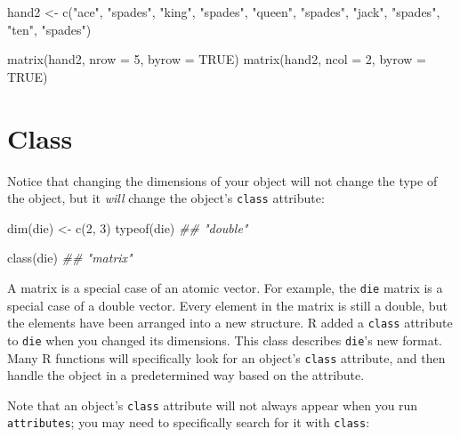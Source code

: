 \documentclass[
  letterpaper,
  DIV=11,
  numbers=noendperiod]{scrbook}
\newenvironment{Shaded}{\begin{snugshade}}{\end{snugshade}}
\newcommand{\AttributeTok}[1]{\textcolor[rgb]{0.40,0.45,0.13}{#1}}
\newcommand{\ConstantTok}[1]{\textcolor[rgb]{0.56,0.35,0.01}{#1}}
\newcommand{\DecValTok}[1]{\textcolor[rgb]{0.68,0.00,0.00}{#1}}
\newcommand{\DocumentationTok}[1]{\textcolor[rgb]{0.37,0.37,0.37}{\textit{#1}}}
\newcommand{\FunctionTok}[1]{\textcolor[rgb]{0.28,0.35,0.67}{#1}}
\newcommand{\NormalTok}[1]{\textcolor[rgb]{0.00,0.23,0.31}{#1}}
\newcommand{\OtherTok}[1]{\textcolor[rgb]{0.00,0.23,0.31}{#1}}
\newcommand{\StringTok}[1]{\textcolor[rgb]{0.13,0.47,0.30}{#1}}
\begin{document}
\begin{Shaded}
\begin{Highlighting}[]
\NormalTok{hand2 }\OtherTok{\textless{}{-}} \FunctionTok{c}\NormalTok{(}\StringTok{"ace"}\NormalTok{, }\StringTok{"spades"}\NormalTok{, }\StringTok{"king"}\NormalTok{, }\StringTok{"spades"}\NormalTok{, }\StringTok{"queen"}\NormalTok{, }\StringTok{"spades"}\NormalTok{, }\StringTok{"jack"}\NormalTok{, }
  \StringTok{"spades"}\NormalTok{, }\StringTok{"ten"}\NormalTok{, }\StringTok{"spades"}\NormalTok{)}

\FunctionTok{matrix}\NormalTok{(hand2, }\AttributeTok{nrow =} \DecValTok{5}\NormalTok{, }\AttributeTok{byrow =} \ConstantTok{TRUE}\NormalTok{)}
\FunctionTok{matrix}\NormalTok{(hand2, }\AttributeTok{ncol =} \DecValTok{2}\NormalTok{, }\AttributeTok{byrow =} \ConstantTok{TRUE}\NormalTok{)}
\end{Highlighting}
\end{Shaded}

\section{Class}\label{class}

Notice that changing the dimensions of your object will not change the
type of the object, but it \emph{will} change the object's
\texttt{class} attribute:

\begin{Shaded}
\begin{Highlighting}[]
\FunctionTok{dim}\NormalTok{(die) }\OtherTok{\textless{}{-}} \FunctionTok{c}\NormalTok{(}\DecValTok{2}\NormalTok{, }\DecValTok{3}\NormalTok{)}
\FunctionTok{typeof}\NormalTok{(die)}
\DocumentationTok{\#\#  "double"}
 
\FunctionTok{class}\NormalTok{(die)}
\DocumentationTok{\#\#  "matrix"}
\end{Highlighting}
\end{Shaded}

A matrix is a special case of an atomic vector. For example, the
\texttt{die} matrix is a special case of a double vector. Every element
in the matrix is still a double, but the elements have been arranged
into a new structure. R added a \texttt{class} attribute to \texttt{die}
when you changed its dimensions. This class describes \texttt{die}'s new
format. Many R functions will specifically look for an object's
\texttt{class} attribute, and then handle the object in a predetermined
way based on the attribute.

Note that an object's \texttt{class} attribute will not always appear
when you run \texttt{attributes}; you may need to specifically search
for it with \texttt{class}:
\end{document}
